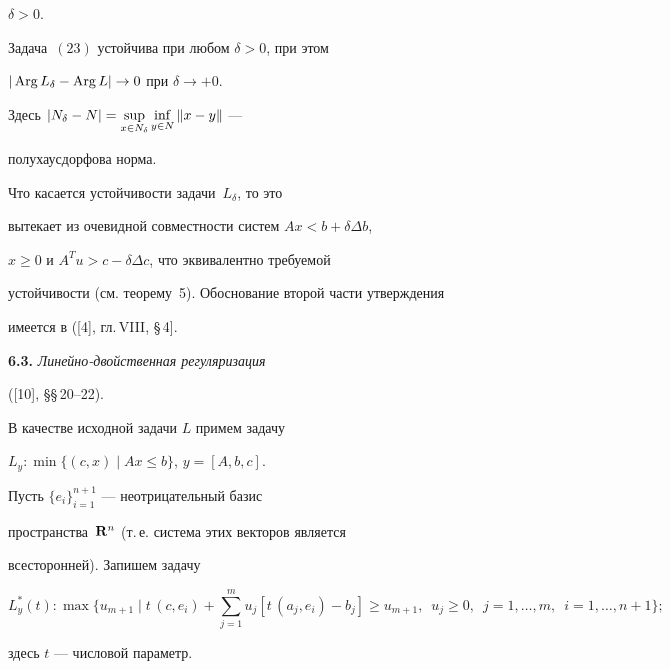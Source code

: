 $\delta>0$.





\begin{thm}


Задача~$(23)$ устойчива при любом $\delta >0$, при этом


$|\operatorname{Arg} L_{\delta}-\operatorname{Arg} L|\to 0$ при $\delta\to +0$.


Здесь  $|N_{\delta}-N|=\sup\limits_{x\in


N_\delta} \inf\limits_{\mathstrut y\in N}\| x-y\|$ ---


полухаусдорфова норма.


\end{thm}





Что касается устойчивости задачи~$L_{\delta}$, то это


вытекает из очевидной совместности систем $Ax<b+\delta\Delta b$,


$x\geq 0$ и $A^Tu>c-\delta\Delta c$, что эквивалентно требуемой


устойчивости (см. теорему~5). Обоснование второй части утверждения


имеется в ([4], гл.\,VIII, \S\,4].


\medskip





{\bf 6.3.} {\it Линейно-двойственная регуляризация}


([10], \S\S\,20--22).


В качестве исходной задачи $L$ примем задачу


$L_y: \min\{(c,x) \mid Ax\leq b\}$, $y=[A,b,c]$.


Пусть $\{e_i\}_{i=1}^{n+1}$ --- неотрицательный базис


пространства~$\bold R^n$ (т.\,е. система этих векторов является


всесторонней). Запишем задачу


$$


L_y^*(t): \max\bigg\{u_{m+1}\mid t\,(c,e_i) +\sum_{j=1}^m


u_j[t\,(a_j,e_i)-b_j]\geq u_{m+1},\ \; u_j\geq 0,\ \;


j=1,\dotsc,m,\ \; i=1,\dotsc,n+1\bigg\};


$$


здесь $t$ --- числовой параметр.





